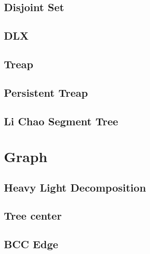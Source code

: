 \documentclass[a4paper,10pt,twocolumn,oneside]{article}
\begin{document}
\subsection{Disjoint Set}


\subsection{DLX}


\subsection{Treap}


\subsection{Persistent Treap}


\subsection{Li Chao Segment Tree}


% 

\section{Graph}

\subsection{Heavy Light Decomposition}


\subsection{Tree center}


\subsection{BCC Edge}

\end{document}
